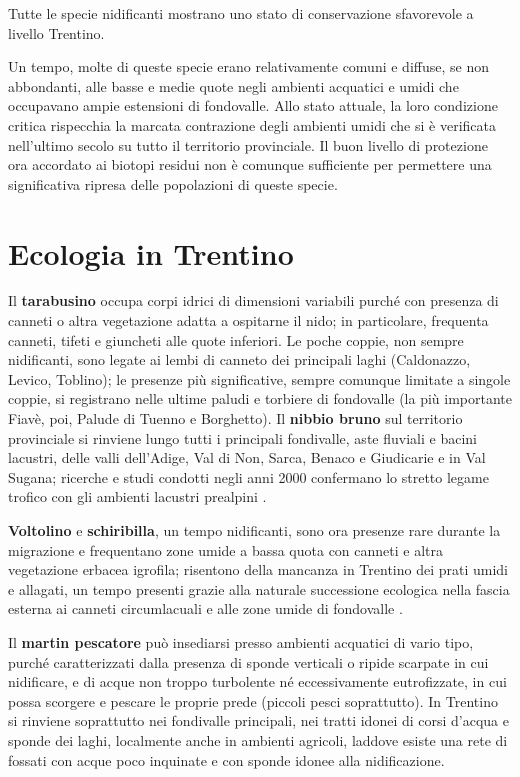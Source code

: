 \documentclass[10pt,twoside,openany,x11names,svgnames,italian,a5paper,dvipsnames,table]{memoir}
\begin{document}
Tutte le specie nidificanti mostrano uno stato di conservazione sfavorevole a livello Trentino.

Un tempo, molte di queste specie erano relativamente comuni e diffuse, se non abbondanti, alle basse e medie quote negli ambienti acquatici e umidi che occupavano ampie estensioni di fondovalle. Allo stato attuale, la loro condizione critica rispecchia la marcata contrazione degli ambienti umidi che si è verificata nell'ultimo secolo su tutto il territorio provinciale. Il buon livello di protezione ora accordato ai biotopi residui non è comunque sufficiente per permettere una significativa ripresa delle popolazioni di queste specie. 

\newpage
\section{Ecologia in Trentino}
Il \textbf{tarabusino} occupa corpi idrici di dimensioni variabili purché con presenza di canneti o altra vegetazione adatta a ospitarne il nido; in particolare, frequenta canneti, tifeti e giuncheti alle quote inferiori. Le poche coppie, non sempre nidificanti, sono legate ai lembi di canneto dei principali laghi (Caldonazzo, Levico, Toblino); le presenze più significative, sempre comunque limitate a singole coppie, si registrano nelle ultime paludi e torbiere di fondovalle (la più importante Fiavè, poi, Palude di Tuenno e Borghetto). 
Il \textbf{nibbio bruno} sul territorio provinciale si rinviene lungo tutti i principali fondivalle, aste fluviali e bacini lacustri, delle valli dell’Adige, Val di Non, Sarca, Benaco e Giudicarie e in Val Sugana; ricerche e studi condotti negli anni 2000 confermano lo stretto legame trofico con gli ambienti lacustri prealpini \cite{Sergio03a} \cite{Sergio03b} \cite{Sergio03c} \cite{Sergio03d}.

\textbf{Voltolino} e \textbf{schiribilla}, un tempo nidificanti, sono ora presenze rare durante la migrazione e frequentano zone umide a bassa quota con canneti e altra vegetazione erbacea igrofila; risentono della mancanza in Trentino dei prati umidi e allagati, un tempo presenti grazie alla naturale successione ecologica nella fascia esterna ai canneti circumlacuali e alle zone umide di fondovalle \cite{Pedrini05}.

Il \textbf{martin pescatore} può insediarsi presso ambienti acquatici di vario tipo, purché caratterizzati dalla presenza di sponde verticali o ripide scarpate in cui nidificare, e di acque non troppo turbolente né eccessivamente eutrofizzate, in cui possa scorgere e pescare le proprie prede (piccoli pesci soprattutto). In Trentino si rinviene soprattutto nei fondivalle principali, nei tratti idonei di corsi d’acqua e sponde dei laghi, localmente anche in ambienti agricoli, laddove esiste una rete di fossati con acque poco inquinate e con sponde idonee alla nidificazione.
\end{document}
